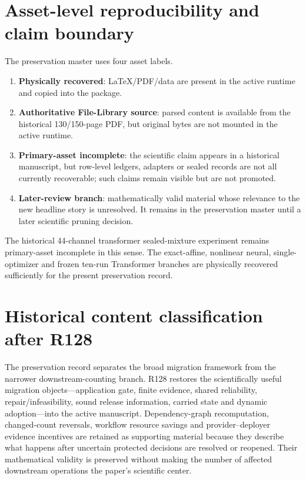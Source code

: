 \documentclass[11pt,letterpaper]{article}
\theoremstyle{plain}
\newcommand{\1}{\mathbf 1}
\begin{document}
\section{Asset-level reproducibility and claim boundary}
The preservation master uses four asset labels.
\begin{enumerate}[leftmargin=1.4em]
\item \textbf{Physically recovered}: LaTeX/PDF/data are present in the active runtime and copied into the package.
\item \textbf{Authoritative File-Library source}: parsed content is available from the historical 130/150-page PDF, but original bytes are not mounted in the active runtime.
\item \textbf{Primary-asset incomplete}: the scientific claim appears in a historical manuscript, but row-level ledgers, adapters or sealed records are not all currently recoverable; such claims remain visible but are not promoted.
\item \textbf{Later-review branch}: mathematically valid material whose relevance to the new headline story is unresolved. It remains in the preservation master until a later scientific pruning decision.
\end{enumerate}
The historical 44-channel transformer sealed-mixture experiment remains primary-asset incomplete in this sense. The exact-affine, nonlinear neural, single-optimizer and frozen ten-run Transformer branches are physically recovered sufficiently for the present preservation record.

\clearpage
\section{Historical content classification after R128}
The preservation record separates the broad migration framework from the narrower downstream-counting branch. R128 restores the scientifically useful migration objects---application gate, finite evidence, shared reliability, repair/infeasibility, sound release information, carried state and dynamic adoption---into the active manuscript. Dependency-graph recomputation, changed-count reversals, workflow resource savings and provider--deployer evidence incentives are retained as supporting material because they describe what happens after uncertain protected decisions are resolved or reopened. Their mathematical validity is preserved without making the number of affected downstream operations the paper's scientific center.
\end{document}
